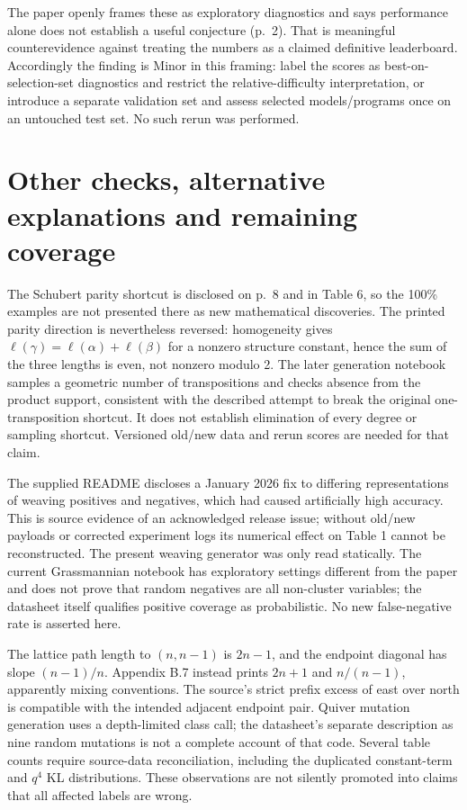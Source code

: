 \documentclass[10pt]{article}
\begin{document}
The paper openly frames these as exploratory diagnostics and says performance alone does not establish a useful conjecture (p. 2). That is meaningful counterevidence against treating the numbers as a claimed definitive leaderboard. Accordingly the finding is Minor in this framing: label the scores as best-on-selection-set diagnostics and restrict the relative-difficulty interpretation, or introduce a separate validation set and assess selected models/programs once on an untouched test set. No such rerun was performed.\par
\section*{Other checks, alternative explanations and remaining coverage}
The Schubert parity shortcut is disclosed on p. 8 and in Table 6, so the 100\% examples are not presented there as new mathematical discoveries. The printed parity direction is nevertheless reversed: homogeneity gives \(\ell(\gamma)=\ell(\alpha)+\ell(\beta)\) for a nonzero structure constant, hence the sum of the three lengths is even, not nonzero modulo 2. The later generation notebook samples a geometric number of transpositions and checks absence from the product support, consistent with the described attempt to break the original one-transposition shortcut. It does not establish elimination of every degree or sampling shortcut. Versioned old/new data and rerun scores are needed for that claim.\par
The supplied README discloses a January 2026 fix to differing representations of weaving positives and negatives, which had caused artificially high accuracy. This is source evidence of an acknowledged release issue; without old/new payloads or corrected experiment logs its numerical effect on Table 1 cannot be reconstructed. The present weaving generator was only read statically. The current Grassmannian notebook has exploratory settings different from the paper and does not prove that random negatives are all non-cluster variables; the datasheet itself qualifies positive coverage as probabilistic. No new false-negative rate is asserted here.\par
The lattice path length to \((n,n-1)\) is \(2n-1\), and the endpoint diagonal has slope \((n-1)/n\). Appendix B.7 instead prints \(2n+1\) and \(n/(n-1)\), apparently mixing conventions. The source’s strict prefix excess of east over north is compatible with the intended adjacent endpoint pair. Quiver mutation generation uses a depth-limited class call; the datasheet’s separate description as nine random mutations is not a complete account of that code. Several table counts require source-data reconciliation, including the duplicated constant-term and \(q^4\) KL distributions. These observations are not silently promoted into claims that all affected labels are wrong.\par
\end{document}
